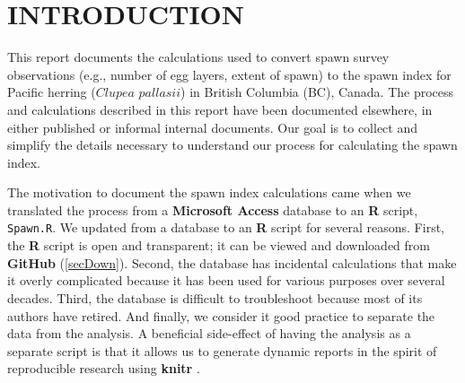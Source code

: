 \documentclass[12pt]{article}
\begin{document}
\renewcommand\listfigurename{LIST OF FIGURES}
\renewcommand\listtablename{LIST OF TABLES}

\renewcommand*{\thefootnote}{\fnsymbol{footnote}}


\tableofcontents\clearpage  %
\listoffigures \listoftables \clearpage  %

\thispagestyle{empty}  %
\renewcommand*{\thefootnote}{\arabic{footnote}}  %
\setcounter{footnote}{0}  %


\section{INTRODUCTION}

This report documents the calculations used to convert spawn survey observations (e.g., number of egg layers, extent of spawn) to the spawn index for Pacific herring ($Clupea$ $pallasii$) in British Columbia (BC), Canada.
The process and calculations described in this report have been documented elsewhere, in either published or informal internal documents.
Our goal is to collect and simplify the details necessary to understand our process for calculating the spawn index.

The motivation to document the spawn index calculations came when we translated the process from a \textbf{Microsoft Access} database to an \textbf{R} \citeyearpar[RCT][]{R-3.3.2} script, \texttt{Spawn.R}.
We updated from a database to an \textbf{R} script for several reasons.
First, the \textbf{R} script is open and transparent; it can be viewed and downloaded from \textbf{GitHub} (\autoref{secDown}).
Second, the database has incidental calculations that make it overly complicated because it has been used for various purposes over several decades.
Third, the database is difficult to troubleshoot because most of its authors have retired.
And finally, we consider it good practice to separate the data from the analysis.
A beneficial side-effect of having the analysis as a separate script is that it allows us to generate dynamic reports in the spirit of reproducible research using \textbf{knitr} \citep{Xie2015}.
\end{document}
